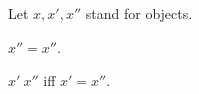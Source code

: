 \begin{forthel}
    Let $x, x', x''$ stand for  objects.

    \begin{axiom}
        $x'' = x''$.
    \end{axiom}

    \begin{definition}
        $x' ~  x''$ iff $x' = x''$.
    \end{definition}
\end{forthel}
